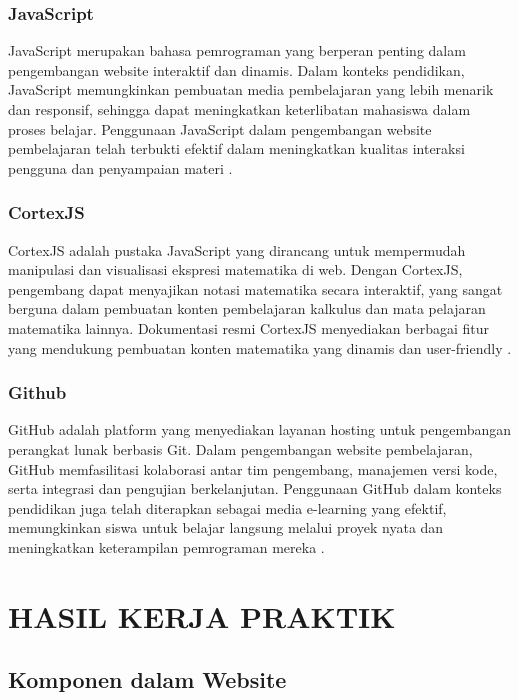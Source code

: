 \documentclass{file/KP-ITS}
\theoremstyle{definition}
\theoremstyle{definition}
\theoremstyle{plain}
\begin{document}
\subsection{JavaScript}

JavaScript merupakan bahasa pemrograman yang berperan penting dalam pengembangan website interaktif dan dinamis. Dalam konteks pendidikan, JavaScript memungkinkan pembuatan media pembelajaran yang lebih menarik dan responsif, sehingga dapat meningkatkan keterlibatan mahasiswa dalam proses belajar. Penggunaan JavaScript dalam pengembangan website pembelajaran telah terbukti efektif dalam meningkatkan kualitas interaksi pengguna dan penyampaian materi \cite{insana2021pengembangan}.

\subsection{CortexJS}

CortexJS adalah pustaka JavaScript yang dirancang untuk mempermudah manipulasi dan visualisasi ekspresi matematika di web. Dengan CortexJS, pengembang dapat menyajikan notasi matematika secara interaktif, yang sangat berguna dalam pembuatan konten pembelajaran kalkulus dan mata pelajaran matematika lainnya. Dokumentasi resmi CortexJS menyediakan berbagai fitur yang mendukung pembuatan konten matematika yang dinamis dan user-friendly \cite{cortexjs2025}.

\subsection{Github}

GitHub adalah platform yang menyediakan layanan hosting untuk pengembangan perangkat lunak berbasis Git. Dalam pengembangan website pembelajaran, GitHub memfasilitasi kolaborasi antar tim pengembang, manajemen versi kode, serta integrasi dan pengujian berkelanjutan. Penggunaan GitHub dalam konteks pendidikan juga telah diterapkan sebagai media e-learning yang efektif, memungkinkan siswa untuk belajar langsung melalui proyek nyata dan meningkatkan keterampilan pemrograman mereka \cite{rahmawati2021penerapan}.


\chapter{HASIL KERJA PRAKTIK}
\section{Komponen dalam Website}
\end{document}
